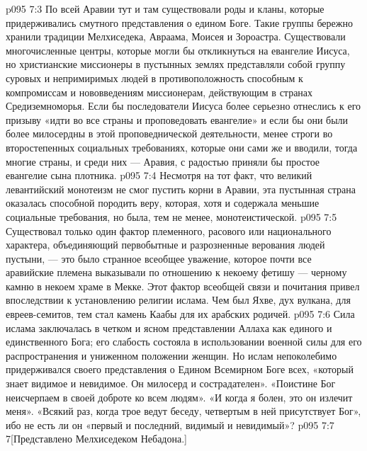 \vs p095 7:3 По всей Аравии тут и там существовали роды и кланы, которые придерживались смутного представления о едином Боге. Такие группы бережно хранили традиции Мелхиседека, Авраама, Моисея и Зороастра. Существовали многочисленные центры, которые могли бы откликнуться на евангелие Иисуса, но христианские миссионеры в пустынных землях представляли собой группу суровых и непримиримых людей в противоположность способным к компромиссам и нововведениям миссионерам, действующим в странах Средиземноморья. Если бы последователи Иисуса более серьезно отнеслись к его призыву «идти во все страны и проповедовать евангелие» и если бы они были более милосердны в этой проповеднической деятельности, менее строги во второстепенных социальных требованиях, которые они сами же и вводили, тогда многие страны, и среди них --- Аравия, с радостью приняли бы простое евангелие сына плотника.
\vs p095 7:4 Несмотря на тот факт, что великий левантийский монотеизм не смог пустить корни в Аравии, эта пустынная страна оказалась способной породить веру, которая, хотя и содержала меньшие социальные требования, но была, тем не менее, монотеистической.
\vs p095 7:5 Существовал только один фактор племенного, расового или национального характера, объединяющий первобытные и разрозненные верования людей пустыни, --- это было странное всеобщее уважение, которое почти все аравийские племена выказывали по отношению к некоему фетишу --- черному камню в некоем храме в Мекке. Этот фактор всеобщей связи и почитания привел впоследствии к установлению религии ислама. Чем был Яхве, дух вулкана, для евреев\hyp{}семитов, тем стал камень Каабы для их арабских родичей.
\vs p095 7:6 Сила ислама заключалась в четком и ясном представлении Аллаха как единого и единственного Бога; его слабость состояла в использовании военной силы для его распространения и униженном положении женщин. Но ислам непоколебимо придерживался своего представления о Едином Всемирном Боге всех, «который знает видимое и невидимое. Он милосерд и сострадателен». «Поистине Бог неисчерпаем в своей доброте ко всем людям». «И когда я болен, это он излечит меня». «Всякий раз, когда трое ведут беседу, четвертым в ней присутствует Бог», ибо не есть ли он «первый и последний, видимый и невидимый»?
\vsetoff
\vs p095 7:7 7[Представлено Мелхиседеком Небадона.]
